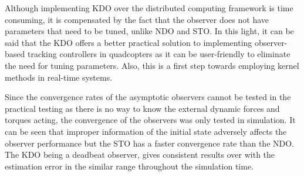 \documentclass[letterpaper%
, twoside%
, 12pt%
,memoire%
, english%
,creativecommons,hyperref%
]{thETS}
\theoremstyle{newThmStyle}
\begin{document}
Although implementing KDO over the distributed computing framework is time consuming, it is compensated by the fact that the observer does not have parameters that need to be tuned, unlike NDO and STO. In this light, it can be said that the KDO offers a better practical solution to implementing observer-based tracking controllers in quadcopters as it can be user-friendly to eliminate the need for tuning parameters. Also, this is a first step towards employing kernel methods in real-time systems. 

Since the convergence rates of the asymptotic observers cannot be tested in the practical testing as there is no way to know the external dynamic forces and torques acting, the convergence of the observers was only tested in simulation. It can be seen that improper information of the initial state adversely affects the observer performance but the STO has a faster convergence rate than the NDO. The KDO being a deadbeat observer, gives consistent results over with the estimation error in the similar range throughout the simulation time.
\end{document}
